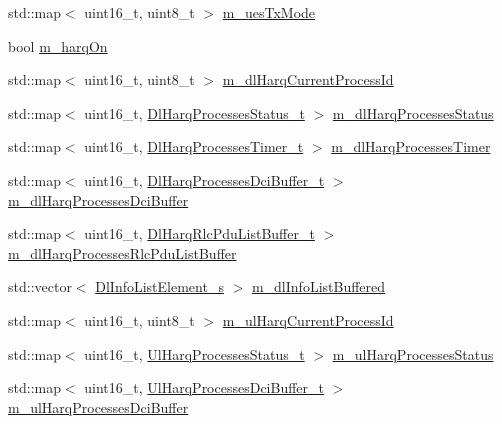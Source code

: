 \begin{DoxyCompactItemize}
std\+::map$<$ uint16\+\_\+t, uint8\+\_\+t $>$ \hyperlink{classns3_1_1FdBetFfMacScheduler_a1a3c593a10fbac9008cb1b991746dda2}{m\+\_\+ues\+Tx\+Mode}
\item 
bool \hyperlink{classns3_1_1FdBetFfMacScheduler_a37792b61da166e932f6697569d19a479}{m\+\_\+harq\+On}
\item 
std\+::map$<$ uint16\+\_\+t, uint8\+\_\+t $>$ \hyperlink{classns3_1_1FdBetFfMacScheduler_a7c1cfb93fd3fa63e6811486c023934c2}{m\+\_\+dl\+Harq\+Current\+Process\+Id}
\item 
std\+::map$<$ uint16\+\_\+t, \hyperlink{namespacens3_a457b3571b67ff17d042e9894e90e2ce2}{Dl\+Harq\+Processes\+Status\+\_\+t} $>$ \hyperlink{classns3_1_1FdBetFfMacScheduler_a93d8bf3298e9b289d9fcf70571b27b78}{m\+\_\+dl\+Harq\+Processes\+Status}
\item 
std\+::map$<$ uint16\+\_\+t, \hyperlink{namespacens3_a39413ade536de4b1c82d6c0074cc703e}{Dl\+Harq\+Processes\+Timer\+\_\+t} $>$ \hyperlink{classns3_1_1FdBetFfMacScheduler_a78314b001be9986429ecb13daac0885a}{m\+\_\+dl\+Harq\+Processes\+Timer}
\item 
std\+::map$<$ uint16\+\_\+t, \hyperlink{namespacens3_af25599bf8f9f564075c005759c9af18c}{Dl\+Harq\+Processes\+Dci\+Buffer\+\_\+t} $>$ \hyperlink{classns3_1_1FdBetFfMacScheduler_af37ecddc35da4f5a44cc0c50b08a4a96}{m\+\_\+dl\+Harq\+Processes\+Dci\+Buffer}
\item 
std\+::map$<$ uint16\+\_\+t, \hyperlink{namespacens3_a4c0cbd1e72f1c667f8b5879655f13210}{Dl\+Harq\+Rlc\+Pdu\+List\+Buffer\+\_\+t} $>$ \hyperlink{classns3_1_1FdBetFfMacScheduler_ace3cb887417444023ca2f39d5de6a7cf}{m\+\_\+dl\+Harq\+Processes\+Rlc\+Pdu\+List\+Buffer}
\item 
std\+::vector$<$ \hyperlink{structns3_1_1DlInfoListElement__s}{Dl\+Info\+List\+Element\+\_\+s} $>$ \hyperlink{classns3_1_1FdBetFfMacScheduler_ae987d949dcc264154314730346f4a7a8}{m\+\_\+dl\+Info\+List\+Buffered}
\item 
std\+::map$<$ uint16\+\_\+t, uint8\+\_\+t $>$ \hyperlink{classns3_1_1FdBetFfMacScheduler_a12a5dedfa74cd590624828dcffafa855}{m\+\_\+ul\+Harq\+Current\+Process\+Id}
\item 
std\+::map$<$ uint16\+\_\+t, \hyperlink{namespacens3_af765c4daaafe4ea4809c1041fc196629}{Ul\+Harq\+Processes\+Status\+\_\+t} $>$ \hyperlink{classns3_1_1FdBetFfMacScheduler_a7abd82b962ddf3b3fb688de9528bc04a}{m\+\_\+ul\+Harq\+Processes\+Status}
\item 
std\+::map$<$ uint16\+\_\+t, \hyperlink{namespacens3_a042cbd6bf67e73911cba35b8c070223d}{Ul\+Harq\+Processes\+Dci\+Buffer\+\_\+t} $>$ \hyperlink{classns3_1_1FdBetFfMacScheduler_a9b0359136a7f50a8baf80b3b17367869}{m\+\_\+ul\+Harq\+Processes\+Dci\+Buffer}

\end{DoxyCompactItemize}

